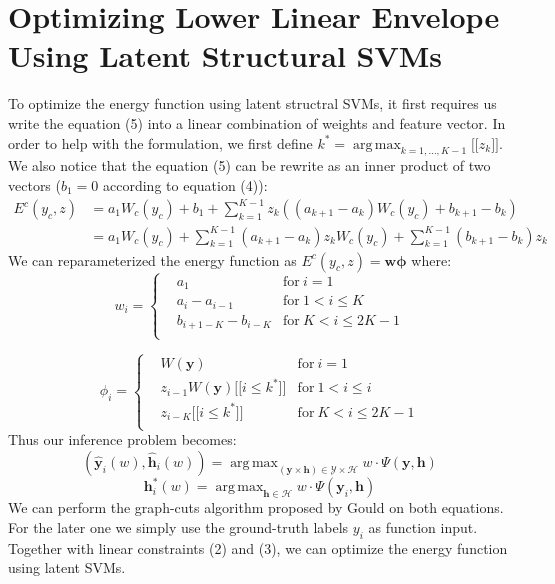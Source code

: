 \documentclass{article}
\DeclareMathOperator*{\argmax}{arg\,max}
\begin{document}
		\section{Optimizing Lower Linear Envelope Using Latent Structural SVMs}
		To optimize the energy function using latent structral SVMs, it first requires us write the equation (5) into a linear combination of weights and feature vector. In order to help with the formulation, we first define $k^* = \argmax_{k=1,\dots,K-1} \big[\big[z_{k}\big]\big]$. We also notice that the equation (5) can be rewrite as an inner product of two vectors ($b_1=0$ according to equation  (4)):
		\begin{align*}
		E^c(y_c,z)&=a_1W_c(y_c)+b_1+\sum_{k=1}^{K-1}z_k((a_{k+1}-a_k)W_c(y_c)+b_{k+1}-b_k)\\
		&=a_1W_c(y_c)+\sum_{k=1}^{K-1}(a_{k+1}-a_k)z_kW_c(y_c)+\sum_{k=1}^{K-1}(b_{k+1}-b_k)z_k
		\end{align*}
		We can reparameterized the energy function as $E^c(y_c,z)=\mathbf{w}\mathbf{\phi}$ where:
		\begin{equation}
			w_i = \left\{
			\begin{aligned}
				& a_1	& \text{for} \ i=1\\
				& a_i-a_{i-1} & \text{for}\ 1< i \leq K\\
				& b_{i+1-K}-b_{i-K} & \text{for} \ K<i\le2K-1\\
			\end{aligned}
			\right.
		\end{equation}
		
		\begin{equation}
		\phi_i = \left\{
		\begin{aligned}
		& W(\mathbf{y}) 	& \text{for} \ i=1\\
		& z_{i-1}W(\mathbf{y})\bigg[\bigg[i\le k^*\bigg]\bigg] & \text{for}\ 1<i\le i\\
		& z_{i-K}\bigg[\bigg[ i\le k^*\bigg]\bigg]  & \text{for} \ K<i\le2K-1\\
		\end{aligned}
		\right.
		\end{equation}
		Thus our inference problem becomes:
		$$
		(\mathbf{\hat{y}}_i(w),\mathbf{\hat{h}}_i(w))=\argmax_{(\mathbf{y} \times \mathbf{h}) \in \mathcal{Y} \times \mathcal{H}} w\cdot\Psi(\mathbf{y},\mathbf{h})
		$$
		$$
		\mathbf{h}^*_i(w) = \argmax_{\mathbf{h} \in \mathcal{H}} w \cdot \Psi(\mathbf{y}_i,\mathbf{h})
		$$
		We can perform the graph-cuts algorithm proposed by Gould\cite{gouldlearning} on both equations. For the later one we simply use the ground-truth labels $y_i$ as function input. Together with linear constraints (2) and (3), we can optimize the energy function using latent SVMs.

	\renewcommand\refname{Bibliography}
	
	
\end{document}

